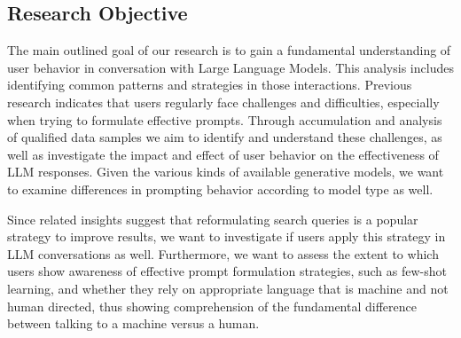 
%

\subsection{Research Objective}
\label{subsec:research-objective}
The main outlined goal of our research is to gain a fundamental understanding of user behavior in conversation with Large Language Models.
This analysis includes identifying common patterns and strategies in those interactions.
Previous research indicates that users regularly face challenges and difficulties, especially
when trying to formulate effective prompts.
Through accumulation and analysis of qualified data samples we aim to identify and understand these
challenges,
as well as investigate the impact and effect of user behavior on the effectiveness of LLM responses.
Given the various kinds of available generative models, we want to examine differences in
prompting behavior according to model type as well.

Since related insights suggest that reformulating search queries is a popular strategy to improve
results, we want to investigate if users apply this strategy in LLM conversations as well. %
Furthermore, we want to assess the extent to which users show awareness of effective prompt
formulation strategies, such as few-shot learning, and whether they rely on appropriate language
that is machine and not human directed, thus showing comprehension of the fundamental difference
between talking to a machine versus a human.

